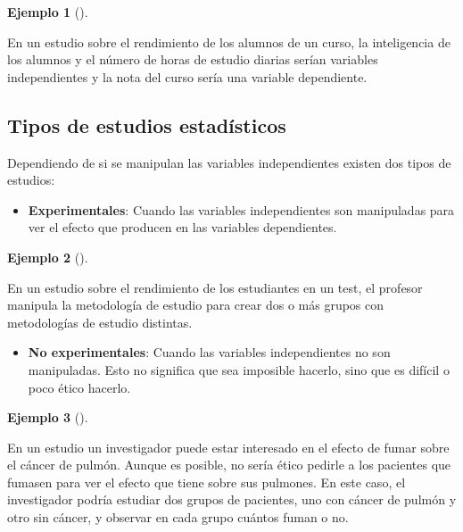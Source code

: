 \documentclass[
  spanish,
  a4paper,
]{scrreport}
\providecommand{\tightlist}{%
  \setlength{\itemsep}{0pt}\setlength{\parskip}{0pt}}
\theoremstyle{plain}
\theoremstyle{definition}
\newtheorem{example}{Ejemplo}[chapter]
\theoremstyle{definition}
\theoremstyle{remark}
\begin{document}
\begin{example}[]\protect\hypertarget{exm-variables-dependientes-independientes}{}\label{exm-variables-dependientes-independientes}

En un estudio sobre el rendimiento de los alumnos de un curso, la
inteligencia de los alumnos y el número de horas de estudio diarias
serían variables independientes y la nota del curso sería una variable
dependiente.

\end{example}

\subsection{Tipos de estudios
estadísticos}\label{tipos-de-estudios-estaduxedsticos}

Dependiendo de si se manipulan las variables independientes existen dos
tipos de estudios:

\begin{itemize}
\tightlist
\item
  \textbf{Experimentales}: Cuando las variables independientes son
  manipuladas para ver el efecto que producen en las variables
  dependientes.
\end{itemize}

\begin{example}[]\protect\hypertarget{exm-estudios-experimentales}{}\label{exm-estudios-experimentales}

En un estudio sobre el rendimiento de los estudiantes en un test, el
profesor manipula la metodología de estudio para crear dos o más grupos
con metodologías de estudio distintas.

\end{example}

\begin{itemize}
\tightlist
\item
  \textbf{No experimentales}: Cuando las variables independientes no son
  manipuladas. Esto no significa que sea imposible hacerlo, sino que es
  difícil o poco ético hacerlo.
\end{itemize}

\begin{example}[]\protect\hypertarget{exm-estudios-no-experimentales}{}\label{exm-estudios-no-experimentales}

En un estudio un investigador puede estar interesado en el efecto de
fumar sobre el cáncer de pulmón. Aunque es posible, no sería ético
pedirle a los pacientes que fumasen para ver el efecto que tiene sobre
sus pulmones. En este caso, el investigador podría estudiar dos grupos
de pacientes, uno con cáncer de pulmón y otro sin cáncer, y observar en
cada grupo cuántos fuman o no.

\end{example}
\end{document}
